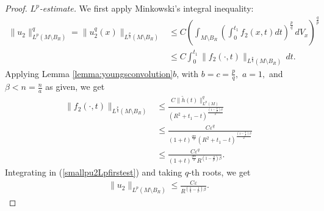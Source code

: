 \documentclass[12pt]{amsart}
\renewcommand{\1}{{\mathbf 1}}
\newcommand{\eps}{{\varepsilon}}
\theoremstyle{others}
\numberwithin{equation}{section}
\begin{document}
\begin{proof}
     
\noindent \emph{$L^p$-estimate.} We first apply Minkowski's integral inequality:
     \begin{equation}\label{smallpu2Lpfirstest}
     \begin{split}
        \| u_2\|^q_{L^{p}(M \setminus B_R)} = \| u_2^q(x) \|_{L^{\frac{p}{q}}(M \setminus B_R)} & \leq C \left( \int_{M \setminus B_R} \left( \int_0^{t_1} f_2(x,t) dt \right)^{\frac{p}{q}} \, dV_x \right)^{\frac{q}{p}} \\
        & \leq C \int_0^{t_1} \|f_2(\cdot, t) \|_{L^{\frac{p}{q}}(M \setminus B_R)} \, dt.
        \end{split}
    \end{equation}
    Applying Lemma \ref{lemma:youngsconvolution}$b$, with $b = c = \frac{p}{q},$ $a = 1,$ and $\beta < n = \frac{n}{a}$ as given, 
    we get
    \begin{equation}
    \begin{split}
    \|f_2(\cdot, t) \|_{L^{\frac{p}{q}}(M \setminus B_R)} & \leq \frac{C \|\tilde{h}(t) \|_{L^p(M)}^q }{ \left( R^2 + t_1 -t \right)^{ \frac{ \left( 1 - \frac{q}{p} \right) \beta}{2} } } \\
    & \leq \frac{C \eps^q }{ (1 + t)^{\frac{qm}{2}} \left( R^2 + t_1 -t \right)^{ \frac{ \left( 1 - \frac{q}{p} \right) \beta}{2} } } \\
    & \leq \frac{C \eps^q }{ (1 + t)^{\frac{qm}{2}} R^{\left( 1 - \frac{q}{p} \right) \beta } }.
    \end{split}
    \end{equation}
    Integrating in (\ref{smallpu2Lpfirstest}) and taking $q$-th roots, we get
   \begin{equation}\label{smallpu2Lpest}
       \begin{split}
           \| u_2 \|_{L^{p}(M \setminus B_R)} \leq \frac{C \eps }{ R^{ \left( \frac{1}{q} - \frac{1}{p} \right)\beta } }.
       \end{split}
   \end{equation} %

   
       \vspace{2mm}
       

\end{proof}
\end{document}
